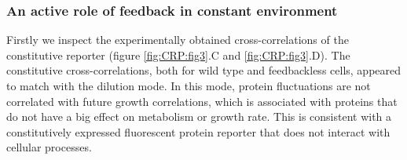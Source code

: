 \subsubsection{An active role of feedback in constant environment}

Firstly we inspect the experimentally obtained cross-correlations of the constitutive reporter (figure \ref{fig:CRP:fig3}.C and \ref{fig:CRP:fig3}.D).
%
The constitutive cross-correlations, both for wild type and feedbackless cells, appeared to match with the dilution mode.
In this mode, protein fluctuations are not correlated with future growth correlations, 
%
which is associated with proteins that do not have a big effect on metabolism or growth rate.
This is consistent with a constitutively expressed fluorescent protein reporter that does not interact with cellular processes. 
%



